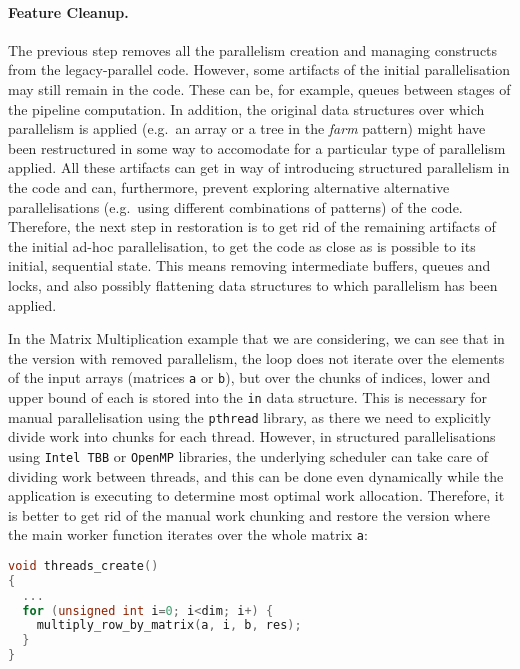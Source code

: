 \documentclass{llncs}
\begin{document}
\paragraph{Feature Cleanup.}
   The previous step removes all the parallelism creation and managing constructs from the legacy-parallel code. However, some artifacts of the initial parallelisation may still remain in the code. These can be, for example, queues between stages of the pipeline computation. In addition, the original data structures over which parallelism is applied (e.g.~an array or a tree in the \emph{farm} pattern) might have been restructured in some way to accomodate for a particular type of parallelism applied. All these artifacts can get in way of introducing structured parallelism in the code and can, furthermore, prevent exploring alternative alternative parallelisations (e.g.~using different combinations of patterns) of the code. Therefore, the next step in restoration is to get rid of the remaining artifacts of the initial ad-hoc parallelisation, to get the code as close as is possible to its initial, sequential state. This means removing intermediate buffers, queues and locks, and also possibly flattening data structures to which parallelism has been applied. 
  
   In the Matrix Multiplication example that we are considering, we can see that in the version with removed parallelism, the loop does not iterate over the elements of the input arrays (matrices \lstinline{a} or \lstinline{b}), but over the chunks of indices, lower and upper bound of each is stored into the \lstinline{in} data structure. This is necessary for manual parallelisation using the \lstinline{pthread} library, as there we need to explicitly divide work into chunks for each thread. However, in structured parallelisations using \lstinline{Intel TBB} or \lstinline{OpenMP} libraries, the underlying scheduler can take care of dividing work between threads, and this can be done even dynamically while the application is executing to determine most optimal work allocation. Therefore, it is better to get rid of the manual work chunking and restore the version where the main worker function iterates over the whole matrix \lstinline{a}:
   
   \begin{lstlisting}[linewidth=\columnwidth,language=C++,basicstyle=\tiny]
void threads_create()
{
  ...
  for (unsigned int i=0; i<dim; i+) {
    multiply_row_by_matrix(a, i, b, res);
  }
}
   \end{lstlisting}
   
\end{document}
